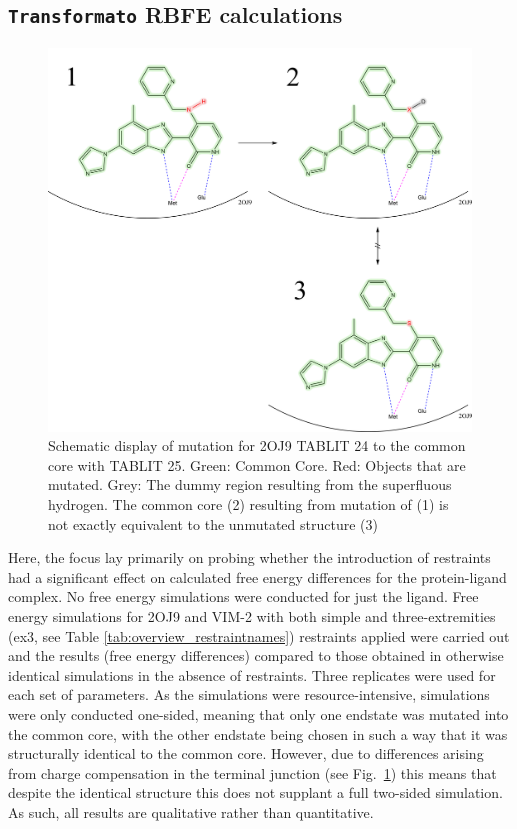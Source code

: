 \documentclass[oneside]{scrreprt}
\begin{document}
\subsection{\texttt{Transformato} RBFE calculations}
\begin{figure}[h]
    \centering
    \includegraphics[width=1\textwidth]{figs/CCnotEq.png}
    \caption[Schematic display of mutation  for 2OJ9 TABLIT 24 to the common core with TABLIT 25.]{Schematic display of mutation  for 2OJ9 TABLIT 24 to the common core with TABLIT 25. Green: Common Core. Red: Objects that are mutated. Grey: The dummy region resulting from the superfluous hydrogen. 
    The common core (2) resulting from mutation of (1) is not exactly equivalent to the unmutated structure (3)}
    \label{fig:CCnotEq}
\end{figure}
Here, the focus lay primarily on probing whether the introduction of restraints had a significant effect on calculated free energy differences for the protein-ligand complex. No free energy simulations were conducted for just the ligand. Free energy simulations for 2OJ9 and VIM-2 with both simple and three-extremities (ex3, see Table \ref{tab:overview_restraintnames}) restraints applied were carried out and the results (free energy differences) compared to those obtained in otherwise identical simulations in the absence of restraints. Three replicates were used for each set of parameters. As the simulations were resource-intensive, simulations were only conducted one-sided, meaning that only one endstate was mutated into the common core, with the other endstate being chosen in such a way that it was structurally identical to the common core. However, due to differences arising from charge compensation in the terminal junction (see Fig.~\ref{fig:CCnotEq}) this means that despite the identical structure this does not supplant a full two-sided simulation. As such, all results are qualitative rather than quantitative.
\end{document}
